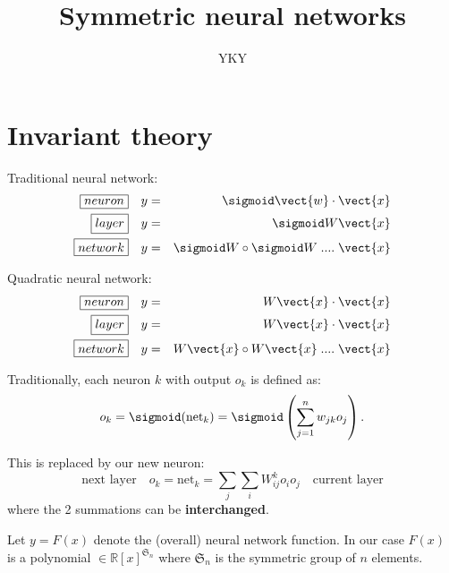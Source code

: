 

\usepackage{xeCJK}
\usepackage{color}
\usepackage{hyperref}

\usepackage{mathtools}
\usepackage{hyperref}

\title{Symmetric neural networks}
\author{YKY}


\maketitle

\section{Invariant theory}

Traditional neural network:
\begin{eqnarray}
\boxed{neuron} \quad & y = & \sigmoid \vect{w} \cdot \vect{x} \nonumber \\
\boxed{layer} \quad & y = & \sigmoid W \vect{x} \nonumber \\
\boxed{network} \quad & y = & \sigmoid W \circ \sigmoid W \; .... \; \vect{x} 
\end{eqnarray}

Quadratic neural network:
\begin{eqnarray}
\boxed{neuron} \quad & y = & W \vect{x} \cdot \vect{x} \nonumber \\
\boxed{layer} \quad & y = & W \vect{x} \cdot \vect{x} \nonumber \\
\boxed{network} \quad & y = & W \vect{x} \circ W \vect{x} \; .... \; \vect{x} 
\end{eqnarray}

Traditionally, each neuron $k$ with output $o_k$ is defined as:
\begin{equation}
o_k = \sigmoid ({\text{net}}_k) = \sigmoid \left(\sum _{j=1}^{n} w_{jk} o_j \right) .
\end{equation}

This is replaced by our new neuron:
\begin{equation}
\boxed{\mbox{next layer}} \quad
o_k = {\text{net}}_k = \sum_j \sum_i W_{ij}^k o_i o_j
\quad \boxed{\mbox{current layer}}
\end{equation}
where the 2 summations can be \textbf{interchanged}.

Let $y = F(x)$ denote the (overall) neural network function.  In our case $F(x)$ is a polynomial $\in \mathbb{R}[x]^{\mathfrak{S}_n}$ where $\mathfrak{S}_n$ is the symmetric group of $n$ elements.

